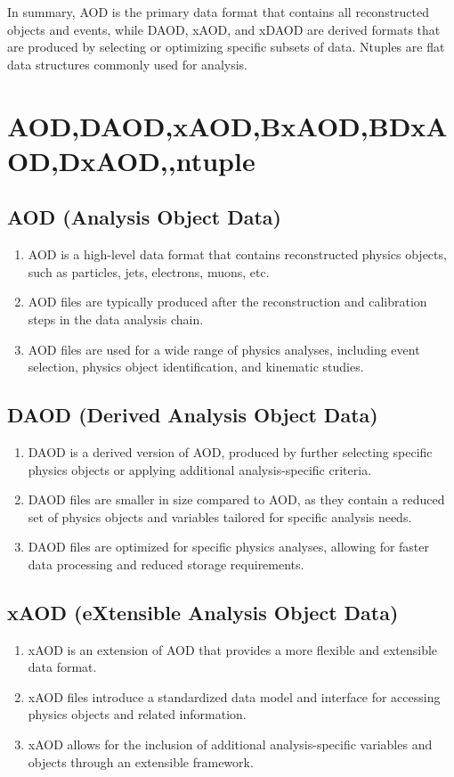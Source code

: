 \documentclass{ctexart}
\begin{document}
In summary, AOD is the primary data format that contains all reconstructed objects and events, while DAOD, xAOD, and xDAOD are derived formats that are produced by selecting or optimizing specific subsets of data. Ntuples are flat data structures commonly used for analysis.


\section{AOD,DAOD,xAOD,BxAOD,BDxAOD,DxAOD,,ntuple}
\subsection{AOD (Analysis Object Data)}
\begin{enumerate}
    \item AOD is a high-level data format that contains reconstructed physics objects, such as particles, jets, electrons, muons, etc.
    \item AOD files are typically produced after the reconstruction and calibration steps in the data analysis chain.
    \item AOD files are used for a wide range of physics analyses, including event selection, physics object identification, and kinematic studies.
\end{enumerate}

\subsection{DAOD (Derived Analysis Object Data)}
\begin{enumerate}
    \item DAOD is a derived version of AOD, produced by further selecting specific physics objects or applying additional analysis-specific criteria.
    \item DAOD files are smaller in size compared to AOD, as they contain a reduced set of physics objects and variables tailored for specific analysis needs.
    \item DAOD files are optimized for specific physics analyses, allowing for faster data processing and reduced storage requirements.
\end{enumerate}

\subsection{xAOD (eXtensible Analysis Object Data)}
\begin{enumerate}
    \item xAOD is an extension of AOD that provides a more flexible and extensible data format.
    \item xAOD files introduce a standardized data model and interface for accessing physics objects and related information.
    \item xAOD allows for the inclusion of additional analysis-specific variables and objects through an extensible framework.
\end{enumerate}
\end{document}
